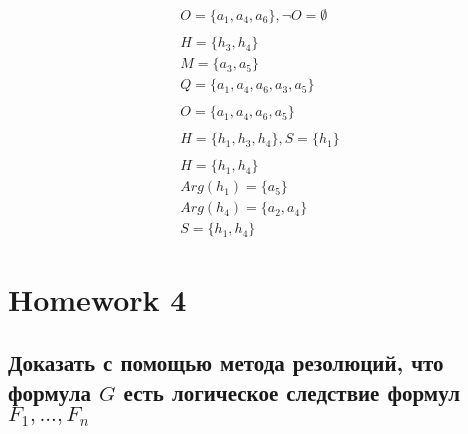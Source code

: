 \documentclass[12pt]{article}
\begin{document}
\begin{gather*}
  O = \{a_1, a_4, a_6\}, \neg O = \emptyset \\\\ %
  H = \{h_3, h_4\} \\ %
  M = \{a_3, a_5\} \\
  Q = \{a_1, a_4, a_6, a_3, a_5\} \\\\ %
  O = \{a_1, a_4, a_6, a_5\} \\\\
  H = \{h_1, h_3, h_4\}, S = \{h_1\} \\\\ %
  H = \{h_1, h_4\} \\ %
  Arg(h_1) = \{a_5\} \\
  Arg(h_4) = \{a_2, a_4\} \\
  S = \{h_1, h_4\}
\end{gather*}

\newpage
\section{Homework 4}

\subsection{Доказать с помощью метода резолюций, что формула $G$ есть логическое следствие формул $F_1,...,F_n$}
\end{document}
